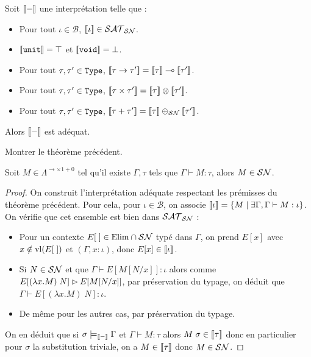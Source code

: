 \begin{them}
    Soit $[\![ - ]\!]$ une interprétation telle que :
    \begin{itemize}[label=$\bullet$]
        \item Pour tout $\iota\in\mathcal B$, $[\![ \iota ]\!]\in\mathcal {SAT}_{\mathcal{SN}}$.
        \item $[\![ \texttt{unit} ]\!] = \top$ et $[\![ \texttt{void} ]\!] = \bot$.
        \item Pour tout $\tau,\tau'\in\texttt{Type}$, $[\![ \tau\to\tau' ]\!]=[\![ \tau ]\!]\multimap[\![ \tau' ]\!]$.
        \item Pour tout $\tau,\tau'\in\texttt{Type}$, $[\![ \tau\times\tau' ]\!]=[\![ \tau ]\!]\otimes[\![ \tau' ]\!]$.
        \item Pour tout $\tau,\tau'\in\texttt{Type}$, $[\![ \tau + \tau' ]\!]=[\![ \tau ]\!]\oplus_\mathcal {SN}[\![ \tau' ]\!]$.
    \end{itemize}

    Alors $[\![ - ]\!]$ est adéquat.
\end{them}

\begin{exo}
    Montrer le théorème précédent.
\end{exo}

\begin{cor}
    Soit $M\in\Lambda^{\to\times1+0}$ tel qu'il existe $\Gamma,\tau$ tels que $\Gamma\vdash M : \tau$, alors $M\in\mathcal {SN}$.
\end{cor}

\begin{proof}
    On construit l'interprétation adéquate respectant les prémisses du théorème précédent. Pour cela, pour $\iota\in\mathcal B$, on associe $[\![ \iota ]\!] = \{M\mid \exists \Gamma, \Gamma\vdash M : \iota\}$. On vérifie que cet ensemble est bien dans $\mathcal {SAT}_{\mathcal{SN}}$ :
    \begin{itemize}[label=$\bullet$]
        \item Pour un contexte $E[\;]\in\mathrm{Elim}\cap\mathcal {SN}$ typé dans $\Gamma$, on prend $E[x]$ avec $x\notin \mathrm{vl}(E[\;])$ et $(\Gamma,x : \iota)$, donc $E[x]\in[\![ \iota ]\!]$.
        \item Si $N\in\mathcal {SN}$ et que $\Gamma\vdash E[M[N/x]] : \iota$ alors comme $E[(\lambda x.M)\;N]\rhd E[M[N/x]]$, par préservation du typage, on déduit que $\Gamma\vdash E[(\lambda x.M)\;N] : \iota$.
        \item De même pour les autres cas, par préservation du typage.
    \end{itemize}

    On en déduit que si $\sigma\models_{[\![ - ]\!]} \Gamma$ et $\Gamma\vdash M : \tau$ alors $M\;\sigma\in[\![ \tau ]\!]$ donc en particulier pour $\sigma$ la substitution triviale, on a $M\in[\![ \tau ]\!]$ donc $M\in\mathcal {SN}$.
\end{proof}